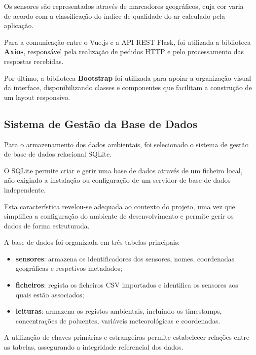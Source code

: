 Os sensores são representados através de
marcadores geográficos, cuja cor varia
de acordo com a classificação do índice
de qualidade do ar calculado pela aplicação.

Para a comunicação entre o Vue.js e a API REST
Flask, foi utilizada a biblioteca \textbf{Axios},
responsável pela realização de pedidos HTTP
e pelo processamento das respostas recebidas.

Por último, a biblioteca \textbf{Bootstrap}
foi utilizada para apoiar a organização visual
da interface, disponibilizando classes e
componentes que facilitam a construção
de um layout responsivo.


\subsection{Sistema de Gestão da Base de Dados}
\label{subsec:sqlite}

Para o armazenamento dos dados ambientais,
foi selecionado o sistema de gestão de base
de dados relacional SQLite.

O SQLite permite criar e gerir uma base de
dados através de um ficheiro local, não
exigindo a instalação ou configuração de
um servidor de base de dados independente.

Esta característica revelou-se adequada
ao contexto do projeto, uma vez que
simplifica a configuração do ambiente
de desenvolvimento e permite gerir
os dados de forma estruturada.

A base de dados foi organizada em três
tabelas principais:

\begin{itemize}

    \item \textbf{sensores}:
    armazena os identificadores dos sensores,
    nomes, coordenadas geográficas
    e respetivos metadados;

    \item \textbf{ficheiros}:
    regista os ficheiros CSV importados
    e identifica os sensores aos quais
    estão associados;

    \item \textbf{leituras}:
    armazena os registos ambientais,
    incluindo os timestamps, concentrações
    de poluentes, variáveis meteorológicas
    e coordenadas.

\end{itemize}

A utilização de chaves primárias e
estrangeiras permite estabelecer relações
entre as tabelas, assegurando a integridade
referencial dos dados.

